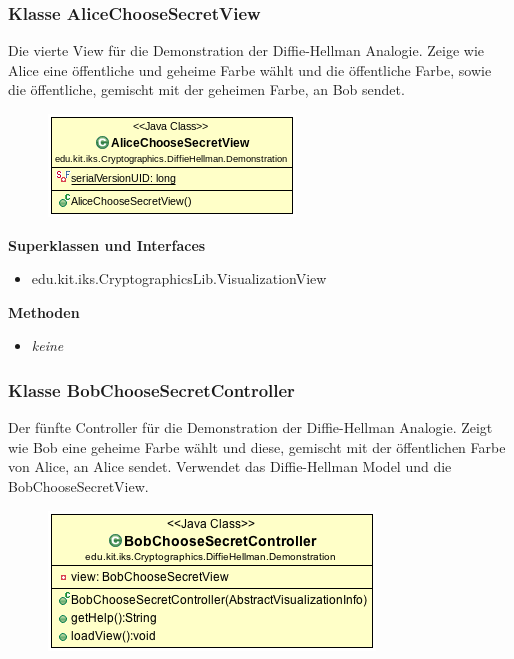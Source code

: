 \documentclass{article}
\begin{document}
\subsubsection{Klasse AliceChooseSecretView}
      Die vierte View für die Demonstration der Diffie-Hellman Analogie.
      Zeige wie Alice eine öffentliche und geheime Farbe wählt und 
      die öffentliche Farbe, sowie die öffentliche, gemischt mit der geheimen Farbe,
      an Bob sendet.

      \begin{figure}[H]
        \centering
        \includegraphics{resources/edu-kit-iks-Cryptographics-DiffieHellman-Demonstration-AliceChooseSecretView}
      \end{figure}

      \textbf{Superklassen und Interfaces}
      \begin{itemize}
        \item edu.kit.iks.CryptographicsLib.VisualizationView
      \end{itemize}

      \textbf{Methoden}
      \begin{itemize}
        \item \textit{keine}
      \end{itemize}

\subsubsection{Klasse BobChooseSecretController}
      Der fünfte Controller für die Demonstration der Diffie-Hellman Analogie.
      Zeigt wie Bob eine geheime Farbe wählt und diese, gemischt mit
      der öffentlichen Farbe von Alice, an Alice sendet.
      Verwendet das Diffie-Hellman Model und die BobChooseSecretView.

      \begin{figure}[H]
        \centering
        \includegraphics{resources/edu-kit-iks-Cryptographics-DiffieHellman-Demonstration-BobChooseSecretController}
      \end{figure}
\end{document}
